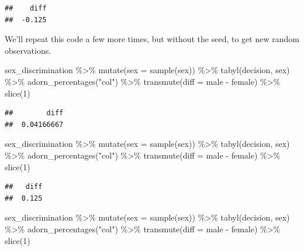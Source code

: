 \documentclass[
]{book}
\newenvironment{Shaded}{\begin{snugshade}}{\end{snugshade}}
\newcommand{\AttributeTok}[1]{\textcolor[rgb]{0.77,0.63,0.00}{#1}}
\newcommand{\DecValTok}[1]{\textcolor[rgb]{0.00,0.00,0.81}{#1}}
\newcommand{\FunctionTok}[1]{\textcolor[rgb]{0.00,0.00,0.00}{#1}}
\newcommand{\NormalTok}[1]{#1}
\newcommand{\SpecialCharTok}[1]{\textcolor[rgb]{0.00,0.00,0.00}{#1}}
\newcommand{\StringTok}[1]{\textcolor[rgb]{0.31,0.60,0.02}{#1}}
\begin{document}
\begin{verbatim}
##    diff
##  -0.125
\end{verbatim}

We'll repeat this code a few more times, but without the seed, to get new random observations.

\begin{Shaded}
\begin{Highlighting}[]
\NormalTok{sex\_discrimination }\SpecialCharTok{\%\textgreater{}\%}
    \FunctionTok{mutate}\NormalTok{(}\AttributeTok{sex =} \FunctionTok{sample}\NormalTok{(sex)) }\SpecialCharTok{\%\textgreater{}\%}
    \FunctionTok{tabyl}\NormalTok{(decision, sex) }\SpecialCharTok{\%\textgreater{}\%}
    \FunctionTok{adorn\_percentages}\NormalTok{(}\StringTok{"col"}\NormalTok{) }\SpecialCharTok{\%\textgreater{}\%}
    \FunctionTok{transmute}\NormalTok{(}\AttributeTok{diff =}\NormalTok{ male }\SpecialCharTok{{-}}\NormalTok{ female) }\SpecialCharTok{\%\textgreater{}\%}
    \FunctionTok{slice}\NormalTok{(}\DecValTok{1}\NormalTok{)}
\end{Highlighting}
\end{Shaded}

\begin{verbatim}
##        diff
##  0.04166667
\end{verbatim}

\begin{Shaded}
\begin{Highlighting}[]
\NormalTok{sex\_discrimination }\SpecialCharTok{\%\textgreater{}\%}
    \FunctionTok{mutate}\NormalTok{(}\AttributeTok{sex =} \FunctionTok{sample}\NormalTok{(sex)) }\SpecialCharTok{\%\textgreater{}\%}
    \FunctionTok{tabyl}\NormalTok{(decision, sex) }\SpecialCharTok{\%\textgreater{}\%}
    \FunctionTok{adorn\_percentages}\NormalTok{(}\StringTok{"col"}\NormalTok{) }\SpecialCharTok{\%\textgreater{}\%}
    \FunctionTok{transmute}\NormalTok{(}\AttributeTok{diff =}\NormalTok{ male }\SpecialCharTok{{-}}\NormalTok{ female) }\SpecialCharTok{\%\textgreater{}\%}
    \FunctionTok{slice}\NormalTok{(}\DecValTok{1}\NormalTok{)}
\end{Highlighting}
\end{Shaded}

\begin{verbatim}
##   diff
##  0.125
\end{verbatim}

\begin{Shaded}
\begin{Highlighting}[]
\NormalTok{sex\_discrimination }\SpecialCharTok{\%\textgreater{}\%}
    \FunctionTok{mutate}\NormalTok{(}\AttributeTok{sex =} \FunctionTok{sample}\NormalTok{(sex)) }\SpecialCharTok{\%\textgreater{}\%}
    \FunctionTok{tabyl}\NormalTok{(decision, sex) }\SpecialCharTok{\%\textgreater{}\%}
    \FunctionTok{adorn\_percentages}\NormalTok{(}\StringTok{"col"}\NormalTok{) }\SpecialCharTok{\%\textgreater{}\%}
    \FunctionTok{transmute}\NormalTok{(}\AttributeTok{diff =}\NormalTok{ male }\SpecialCharTok{{-}}\NormalTok{ female) }\SpecialCharTok{\%\textgreater{}\%}
    \FunctionTok{slice}\NormalTok{(}\DecValTok{1}\NormalTok{)}
\end{Highlighting}
\end{Shaded}
\end{document}
